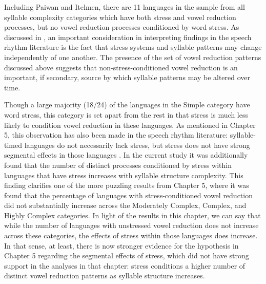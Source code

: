   Including Paiwan and Itelmen, there are 11 languages in the sample from all syllable complexity categories which have both stress and vowel reduction processes, but no vowel reduction processes conditioned by word stress. As discussed in , an important consideration in interpreting findings in the speech rhythm literature is the fact that stress systems and syllable patterns may change independently of one another. The presence of the set of vowel reduction patterns discussed above suggests that non-stress-conditioned vowel reduction is an important, if secondary, source by which syllable patterns may be altered over time.



  Though a large majority (18/24) of the languages in the Simple category have word stress, this category is set apart from the rest in that stress is much less likely to condition vowel reduction in these languages. As mentioned in Chapter 5, this observation has also been made in the speech rhythm literature: syllable-timed languages do not necessarily lack stress, but stress does not have strong segmental effects in those languages \citep{Auer1993}. In the current study it was additionally found that the number of distinct processes conditioned by stress within languages that have stress increases with syllable structure complexity. This finding clarifies one of the more puzzling results from Chapter 5, where it was found that the percentage of languages with stress-conditioned vowel reduction did not substantially increase across the Moderately Complex, Complex, and Highly Complex categories. In light of the results in this chapter, we can say that while the number of languages with unstressed vowel reduction does not increase across these categories, the effects of stress within those languages does increase. In that sense, at least, there is now stronger evidence for the hypothesis in Chapter 5 regarding the segmental effects of stress, which did not have strong support in the analyses in that chapter: stress conditions a higher number of distinct vowel reduction patterns as syllable structure increases.



